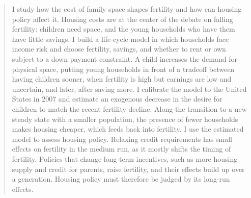\begin{abstract}
\noindent
I study how the cost of family space shapes fertility and how can housing
policy affect it. Housing costs are at the center of the debate on falling
fertility: children need space, and the young households who have them have
little savings. I build a life-cycle model in which households face income risk and choose fertility, savings, and whether to rent or own subject to a down payment constraint. A child increases the demand for physical space, putting young households in front of a tradeoff between having children sooner, when fertility is high but earnings are low and uncertain, and later, after saving more. I calibrate the model to the United States in 2007 and estimate an exogenous decrease in the desire for children to match the recent fertility decline. Along the transition to a new steady state with a smaller population, the presence of fewer households makes housing cheaper, which feeds back into fertility. I use the estimated model to assess housing policy. Relaxing credit requirements has small effects on fertility in the medium run, as it mostly shifts the timing of fertility. Policies that change long-term incentives, such as more
housing supply and credit for parents, raise fertility, and their effects
build up over a generation. Housing policy must therefore be judged by its
long-run effects.

\end{abstract}
